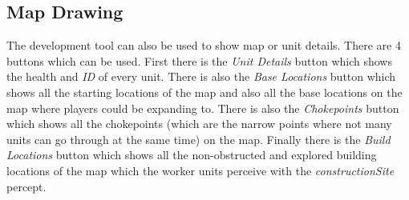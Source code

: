 \subsection{Map Drawing}
The development tool can also be used to show map or unit details. There are 4 buttons which can be used. First there is the \textit{Unit Details} button which shows the health and \textit{ID} of every unit. There is also the \textit{Base Locations} button which shows all the starting locations of the map and also all the base locations on the map where players could be expanding to. There is also the \textit{Chokepoints} button which shows all the chokepoints (which are the narrow points where not many units can go through at the same time) on the map. Finally there is the \textit{Build Locations} button which shows all the non-obstructed and explored building locations of the map which the worker units perceive with the \textit{constructionSite} percept.
